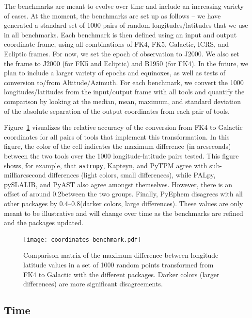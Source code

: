 \documentclass[modern]{aastex62}
\newcommand{\package}[1]{\texttt{#1}\xspace}
\newcommand{\astropypkg}{\package{astropy}}
\renewcommand{\figurename}{Figure\xspace}
\begin{document}
The benchmarks are meant to evolve over time and include an increasing variety
of cases. At the moment, the benchmarks are set up as follows --
we have generated a standard set of 1000 pairs of random longitudes/latitudes
that we use in all benchmarks. Each benchmark is then defined using an input
and output coordinate frame, using all combinations of FK4, FK5, Galactic,
ICRS, and Ecliptic frames. For now, we set the epoch of observation to J2000.
We also set the frame to J2000 (for FK5 and Ecliptic) and B1950 (for FK4).
In the future, we plan to include a larger variety of epochs and equinoxes,
as well as tests of conversion to/from Altitude/Azimuth. For each benchmark,
we convert the 1000 longitudes/latitudes from the input/output frame with all
tools and quantify the comparison by looking at the median, mean, maximum,
and standard deviation of the absolute separation of the output coordinates
from each pair of tools.

\figurename~\ref{fig:coordinate_benchmarks} visualizes the relative accuracy of
the conversion from FK4 to Galactic coordinates for all pairs of tools that
implement this transformation.
In this figure, the color of the cell indicates the maximum difference (in
arcseconds) between the two tools over the 1000 longitude-latitude pairs tested.
This figure shows, for example, that \astropypkg, Kapteyn, and PyTPM agree with
sub-milliarcsecond differences (light colors, small differences), while PALpy,
pySLALIB, and PyAST also agree amongst themselves.
However, there is an offset of around 0.2\arcsec\space between the two groups.
Finally, PyEphem disagrees with all other packages by 0.4--0.8\arcsec (darker
colors, large differences).
These values are only meant to be illustrative and will change over time as the
benchmarks are refined and the packages updated.

\begin{figure}
  \texttt{[image: coordinates-benchmark.pdf]}
  \caption{
    Comparison matrix of the maximum difference between longitude-latitude
    values in a set of 1000 random points transformed from FK4 to Galactic
    with the different packages.
    Darker colors (larger differences) are more significant disagreements.
    \label{fig:coordinate_benchmarks}
  }
\end{figure}

\subsection{Time}
\label{sec:time}
\end{document}
